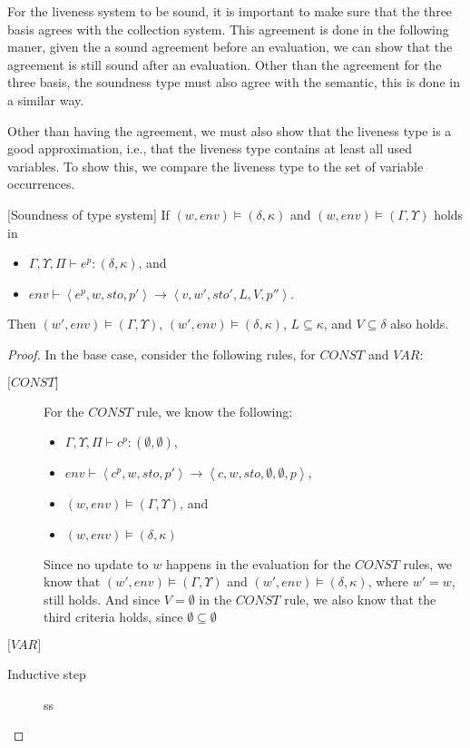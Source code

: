 \documentclass[../../master.tex]{subfiles}
\begin{document}
For the liveness system to be sound, it is important to make sure that the three basis agrees with the collection system.
This agreement is done in the following maner, given the a sound agreement before an evaluation, we can show that the agreement is still sound after an evaluation.
Other than the agreement for the three basis, the soundness type must also agree with the semantic, this is done in a similar way.

Other than having the agreement, we must also show that the liveness type is a good approximation, i.e., that the liveness type contains at least all used variables.
To show this, we compare the liveness type to the set of variable occurrences.


\begin{theorem}{[Soundness of type system]}
	If $(w,env)\models(\delta,\kappa)$ and $(w,env)\models(\Gamma,\Upsilon)$ holds in
	\begin{itemize}
		\item $\Gamma,\Upsilon,\Pi\vdash e^p : (\delta,\kappa)$, and 
		\item $env\vdash\left\langle e^p,w,sto,p'\right\rangle\rightarrow\left\langle v,w',sto',L,V,p''\right\rangle$.
	\end{itemize}
	Then $(w',env)\models(\Gamma,\Upsilon)$, $(w',env)\models(\delta,\kappa)$, $L\subseteq\kappa$, and $V\subseteq\delta$ also holds.
\end{theorem}

\begin{proof}
	In the base case, consider the following rules, for $CONST$ and $VAR$:
	\begin{description}
		\item[$\lbrack CONST \rbrack$] For the $CONST$ rule, we know the following:
			\begin{itemize}
				\item $\Gamma,\Upsilon,\Pi\vdash c^p :(\emptyset,\emptyset)$,
				\item $env\vdash\left\langle c^p,w,sto,p'\right\rangle\rightarrow\left\langle c,w,sto,\emptyset,\emptyset,p\right\rangle$,
				\item $(w,env)\models(\Gamma,\Upsilon)$, and
				\item $(w,env)\models(\delta,\kappa)$
			\end{itemize}
			Since no update to $w$ happens in the evaluation for the $CONST$ rules, we know that $(w',env)\models(\Gamma,\Upsilon)$ and $(w',env)\models(\delta,\kappa)$, where $w'=w$, still holds.
			And since $V=\emptyset$ in the $CONST$ rule, we also know that the third criteria holds, since $\emptyset\subseteq\emptyset$
		\item[$\lbrack VAR \rbrack$]
	\end{description}
	Inductive step
	\begin{description}
		\item[] ss
	\end{description}
\end{proof}
\end{document}
